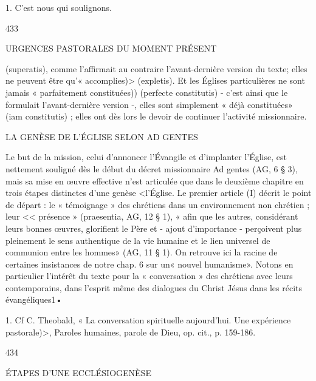 1.	C'est nous qui soulignons.


433
 
URGENCES PASTORALES DU MOMENT PRÉSENT

(superatis), comme l'affirmait au contraire l'avant-dernière version du texte; elles ne peuvent être qu'« accomplies)> (expletis). Et les Églises particulières ne sont jamais « parfaitement constituées)) (perfecte constitutis) - c'est ainsi que le formulait l'avant-dernière version -, elles sont simplement « déjà constituées» (iam constitutis) ; elles ont dès lors le devoir de continuer l'activité missionnaire.

LA GENÈSE DE L'ÉGLISE SELON AD GENTES

Le but de la mission, celui d'annoncer l'Évangile et d'implanter l'Église, est nettement souligné dès le début du décret missionnaire Ad gentes (AG, 6 § 3), mais sa mise en œuvre effective n'est articulée que dans le deuxième chapitre en trois étapes distinctes d'une genèse <l'Église. Le premier article (I) décrit le point de départ : le « témoignage » des chrétiens dans un environnement non chrétien ; leur << présence » (praesentia, AG, 12 § 1), « afin que les autres, considérant leurs bonnes œuvres, glorifient le Père et - ajout d'importance - perçoivent plus pleinement le sens authentique de la vie humaine et le lien universel de communion entre les hommes» (AG, 11 § 1). On retrouve ici la racine de certaines insistances de notre chap. 6 sur un« nouvel humanisme». Notons en particulier l'intérêt du texte pour la « conversation » des chrétiens avec leurs contemporains, dans l'esprit même des dialogues du Christ Jésus dans les récits évangéliques1•

1.	Cf C. Theobald, « La conversation spirituelle aujourd'hui. Une expérience pastorale)>, Paroles humaines, parole de Dieu, op. cit., p. 159-186.

434
 
ÉTAPES D'UNE ECCLÉSIOGENÈSE

